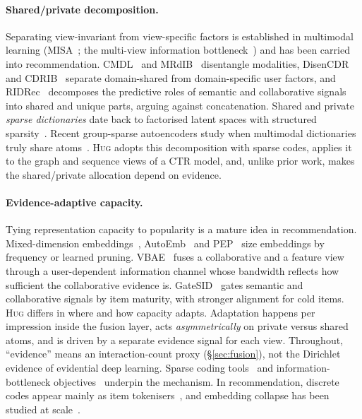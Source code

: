 \documentclass[sigconf,anonymous,review]{acmart}
\newcommand{\method}{\textsc{Hug}}      %
\begin{document}
\paragraph{Shared/private decomposition.}
Separating view-invariant from view-specific factors is established in
multimodal learning (MISA~\cite{hazarika2020misa}; the multi-view information
bottleneck~\cite{federici2020mib}) and has been carried into recommendation.
CMDL~\cite{lin2025cmdl} and MRdIB~\cite{wang2025mrdib} disentangle modalities,
DisenCDR~\cite{cao2022disencdr} and CDRIB~\cite{cao2022cdrib} separate
domain-shared from domain-specific user factors, and RIDRec~\cite{xia2026ridrec}
decomposes the predictive roles of semantic and collaborative signals into
shared and unique parts, arguing against concatenation. Shared and private
\emph{sparse dictionaries} date back to factorised latent spaces with
structured sparsity~\cite{jia2010factorized}. Recent group-sparse autoencoders
study when multimodal dictionaries truly share atoms~\cite{kaushik2026groupsae}.
\method{} adopts this decomposition with sparse codes, applies it to the
graph and sequence views of a CTR model, and, unlike prior work, makes the
shared/private allocation depend on evidence.

\paragraph{Evidence-adaptive capacity.}
Tying representation capacity to popularity is a mature idea in
recommendation. Mixed-dimension embeddings~\cite{ginart2021mde}, AutoEmb~\cite{zhao2021autoemb}
and PEP~\cite{liu2021pep} size embeddings by frequency or learned pruning.
VBAE~\cite{zhu2022vbae} fuses a collaborative and a feature view through a
user-dependent information channel whose bandwidth reflects how sufficient
the collaborative evidence is. GateSID~\cite{zhu2026gatesid} gates semantic and
collaborative signals by item maturity, with stronger alignment for cold items.
\method{} differs in where and how capacity adapts. Adaptation happens per
impression inside the fusion layer, acts \emph{asymmetrically} on private
versus shared atoms, and is driven by a separate evidence signal for each view.
Throughout, ``evidence'' means an interaction-count proxy
(\S\ref{sec:fusion}), not the Dirichlet evidence of evidential deep learning.
Sparse coding tools~\cite{makhzani2014ksparse,gao2024sae,louizos2018l0} and
information-bottleneck objectives~\cite{tishby2000ib,alemi2017vib} underpin the
mechanism. In recommendation, discrete codes appear mainly as item
tokenisers~\cite{rajput2023tiger}, and embedding collapse has been studied at
scale~\cite{guo2024collapse}.
\end{document}
